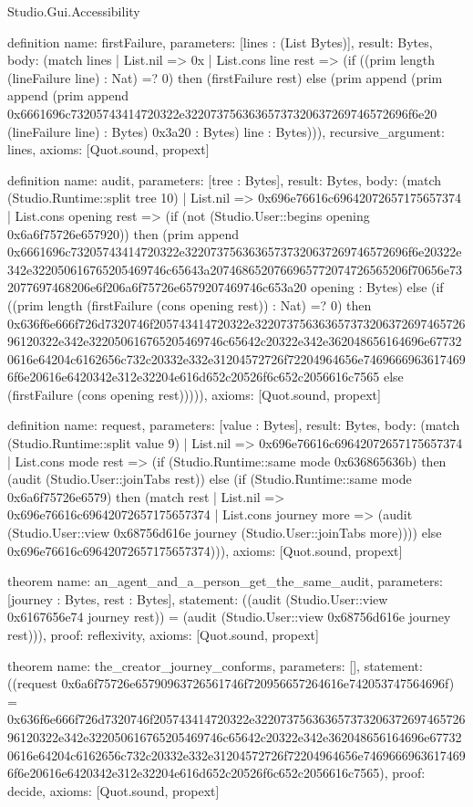 \begin{lexlean}{Studio.Gui.Accessibility}
\begin{semanticmodule}
definition{
  name: firstFailure,
  parameters: [lines : (List Bytes)],
  result: Bytes,
  body: (match lines
    | List.nil => 0x
    | List.cons line rest => (if ((prim length (lineFailure line) : Nat) =? 0) then (firstFailure rest) else (prim append (prim append (prim append 0x6661696c73205743414720322e32207375636365737320637269746572696f6e20 (lineFailure line) : Bytes) 0x3a20 : Bytes) line : Bytes))),
  recursive_argument: lines,
  axioms: [Quot.sound, propext]
}

definition{
  name: audit,
  parameters: [tree : Bytes],
  result: Bytes,
  body: (match (Studio.Runtime::split tree 10)
    | List.nil => 0x696e76616c69642072657175657374
    | List.cons opening rest => (if (not (Studio.User::begins opening 0x6a6f75726e657920)) then (prim append 0x6661696c73205743414720322e32207375636365737320637269746572696f6e20322e342e322050616765205469746c65643a2074686520766965772074726565206f70656e732077697468206e6f206a6f75726e6579207469746c653a20 opening : Bytes) else (if ((prim length (firstFailure (cons opening rest)) : Nat) =? 0) then 0x636f6e666f726d7320746f205743414720322e32207375636365737320637269746572696120322e342e322050616765205469746c65642c20322e342e362048656164696e677320616e64204c6162656c732c20332e332e31204572726f72204964656e74696669636174696f6e20616e6420342e312e32204e616d652c20526f6c652c2056616c7565 else (firstFailure (cons opening rest))))),
  axioms: [Quot.sound, propext]
}

definition{
  name: request,
  parameters: [value : Bytes],
  result: Bytes,
  body: (match (Studio.Runtime::split value 9)
    | List.nil => 0x696e76616c69642072657175657374
    | List.cons mode rest => (if (Studio.Runtime::same mode 0x636865636b) then (audit (Studio.User::joinTabs rest)) else (if (Studio.Runtime::same mode 0x6a6f75726e6579) then (match rest
      | List.nil => 0x696e76616c69642072657175657374
      | List.cons journey more => (audit (Studio.User::view 0x68756d616e journey (Studio.User::joinTabs more)))) else 0x696e76616c69642072657175657374))),
  axioms: [Quot.sound, propext]
}

theorem{
  name: an_agent_and_a_person_get_the_same_audit,
  parameters: [journey : Bytes, rest : Bytes],
  statement: ((audit (Studio.User::view 0x6167656e74 journey rest)) = (audit (Studio.User::view 0x68756d616e journey rest))),
  proof: reflexivity{},
  axioms: [Quot.sound, propext]
}

theorem{
  name: the_creator_journey_conforms,
  parameters: [],
  statement: ((request 0x6a6f75726e65790963726561746f720956657264616e742053747564696f) = 0x636f6e666f726d7320746f205743414720322e32207375636365737320637269746572696120322e342e322050616765205469746c65642c20322e342e362048656164696e677320616e64204c6162656c732c20332e332e31204572726f72204964656e74696669636174696f6e20616e6420342e312e32204e616d652c20526f6c652c2056616c7565),
  proof: decide{},
  axioms: [Quot.sound, propext]
}


\end{semanticmodule}
\end{lexlean}

